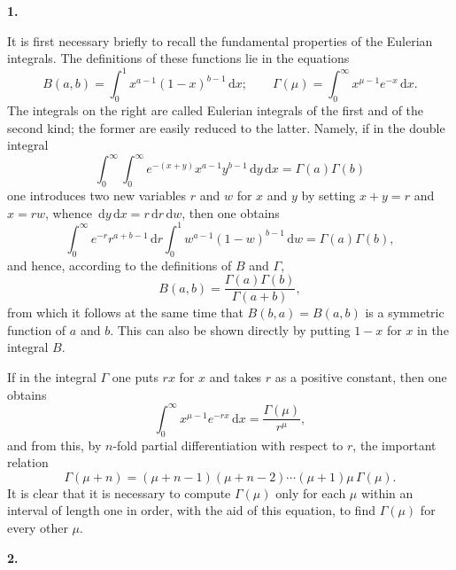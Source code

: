 \documentclass[11pt]{article}
\newcommand{\dd}{\,\mathrm d}
\newcommand{\art}[1]{\bigskip\begin{center}\large\bfseries #1.\end{center}\nopagebreak}
\begin{document}
\art{1}

It is first necessary briefly to recall the fundamental properties of the Eulerian integrals. The definitions of these functions lie in the equations
\begin{equation}
B(a,b)=\int_0^1 x^{a-1}(1-x)^{b-1}\dd x; \qquad
\Gamma(\mu)=\int_0^\infty x^{\mu-1}e^{-x}\dd x .
\tag{1}
\end{equation}
The integrals on the right are called Eulerian integrals of the first and of the second kind; the former are easily reduced to the latter. Namely, if in the double integral
\[
\int_0^\infty\!\int_0^\infty e^{-(x+y)}x^{a-1}y^{b-1}\dd y\dd x=\Gamma(a)\Gamma(b)
\]
one introduces two new variables $r$ and $w$ for $x$ and $y$ by setting $x+y=r$ and $x=rw$, whence $\dd y\dd x=r\dd r\dd w$, then one obtains
\[
\int_0^\infty e^{-r}r^{a+b-1}\dd r\int_0^1 w^{a-1}(1-w)^{b-1}\dd w=\Gamma(a)\Gamma(b),
\]
and hence, according to the definitions of $B$ and $\Gamma$,
\begin{equation}
B(a,b)=\frac{\Gamma(a)\Gamma(b)}{\Gamma(a+b)},
\tag{2}
\end{equation}
from which it follows at the same time that $B(b,a)=B(a,b)$ is a symmetric function of $a$ and $b$. This can also be shown directly by putting $1-x$ for $x$ in the integral $B$.

If in the integral $\Gamma$ one puts $rx$ for $x$ and takes $r$ as a positive constant, then one obtains
\begin{equation}
\int_0^\infty x^{\mu-1}e^{-rx}\dd x=\frac{\Gamma(\mu)}{r^\mu},
\tag{3}
\end{equation}
and from this, by $n$-fold partial differentiation with respect to $r$, the important relation
\begin{equation}
\Gamma(\mu+n)=(\mu+n-1)(\mu+n-2)\cdots(\mu+1)\mu\,\Gamma(\mu).
\tag{4}
\end{equation}
It is clear that it is necessary to compute $\Gamma(\mu)$ only for each $\mu$ within an interval of length one in order, with the aid of this equation, to find $\Gamma(\mu)$ for every other $\mu$.

\art{2}
\end{document}
